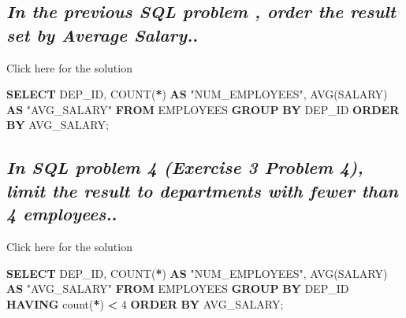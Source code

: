 \documentclass[
]{book}
\newenvironment{Shaded}{\begin{snugshade}}{\end{snugshade}}
\newcommand{\DecValTok}[1]{\textcolor[rgb]{0.00,0.00,0.81}{#1}}
\newcommand{\FunctionTok}[1]{\textcolor[rgb]{0.00,0.00,0.00}{#1}}
\newcommand{\KeywordTok}[1]{\textcolor[rgb]{0.13,0.29,0.53}{\textbf{#1}}}
\newcommand{\NormalTok}[1]{#1}
\newcommand{\OperatorTok}[1]{\textcolor[rgb]{0.81,0.36,0.00}{\textbf{#1}}}
\newcommand{\OtherTok}[1]{\textcolor[rgb]{0.56,0.35,0.01}{#1}}
\begin{document}
\hypertarget{in-the-previous-sql-problem-order-the-result-set-by-average-salary..}{%
\subsection{\texorpdfstring{\emph{In the previous SQL problem , order the result set by Average Salary.}.}{In the previous SQL problem , order the result set by Average Salary..}}\label{in-the-previous-sql-problem-order-the-result-set-by-average-salary..}}

Click here for the solution

\begin{Shaded}
\begin{Highlighting}[]
\KeywordTok{SELECT}\NormalTok{ DEP\_ID, }\FunctionTok{COUNT}\NormalTok{(}\OperatorTok{*}\NormalTok{) }\KeywordTok{AS} \OtherTok{"NUM\_EMPLOYEES"}\NormalTok{, }\FunctionTok{AVG}\NormalTok{(SALARY) }\KeywordTok{AS} \OtherTok{"AVG\_SALARY"}
\KeywordTok{FROM}\NormalTok{ EMPLOYEES}
\KeywordTok{GROUP} \KeywordTok{BY}\NormalTok{ DEP\_ID}
\KeywordTok{ORDER} \KeywordTok{BY}\NormalTok{ AVG\_SALARY;}
\end{Highlighting}
\end{Shaded}

\hypertarget{in-sql-problem-4-exercise-3-problem-4-limit-the-result-to-departments-with-fewer-than-4-employees..}{%
\subsection{\texorpdfstring{\emph{In SQL problem 4 (Exercise 3 Problem 4), limit the result to departments with fewer than 4 employees.}.}{In SQL problem 4 (Exercise 3 Problem 4), limit the result to departments with fewer than 4 employees..}}\label{in-sql-problem-4-exercise-3-problem-4-limit-the-result-to-departments-with-fewer-than-4-employees..}}

Click here for the solution

\begin{Shaded}
\begin{Highlighting}[]
\KeywordTok{SELECT}\NormalTok{ DEP\_ID, }\FunctionTok{COUNT}\NormalTok{(}\OperatorTok{*}\NormalTok{) }\KeywordTok{AS} \OtherTok{"NUM\_EMPLOYEES"}\NormalTok{, }\FunctionTok{AVG}\NormalTok{(SALARY) }\KeywordTok{AS} \OtherTok{"AVG\_SALARY"}
\KeywordTok{FROM}\NormalTok{ EMPLOYEES}
\KeywordTok{GROUP} \KeywordTok{BY}\NormalTok{ DEP\_ID}
\KeywordTok{HAVING} \FunctionTok{count}\NormalTok{(}\OperatorTok{*}\NormalTok{) }\OperatorTok{\textless{}} \DecValTok{4}
\KeywordTok{ORDER} \KeywordTok{BY}\NormalTok{ AVG\_SALARY;}
\end{Highlighting}
\end{Shaded}


  
\end{document}

